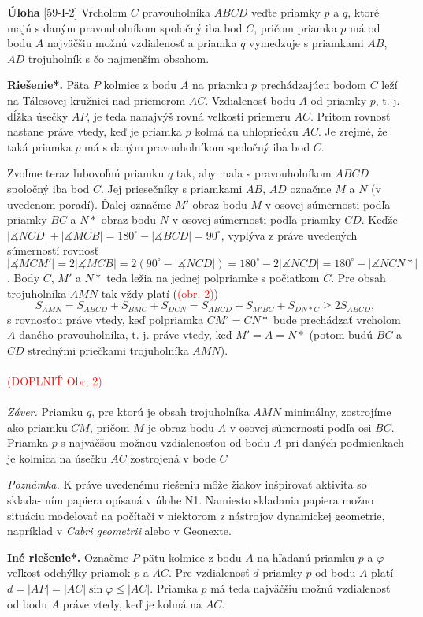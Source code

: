 \documentclass{article}
\newcommand{\rieh}{\textbf{Riešenie*.} }
\newcommand{\ma}{\measuredangle}
\newcommand\todo[1]{\noindent\textcolor{red}{(#1)}}
\newcommand{\problem}[3]{
  \begin{tcolorbox}[breakable,notitle,boxrule=0pt,colback=light-gray,colframe=light-gray]
    \textbf{Úloha}
    [#1] #2
  \end{tcolorbox}
  \noindent#3
}
\begin{document}
\problem{59-I-2}{
Vrcholom $C$ pravouholníka $ABCD$ veďte priamky $p$ a $q$, ktoré majú s daným pravouholníkom spoločný iba bod $C$, pričom priamka $p$ má od bodu $A$ najväčšiu možnú
vzdialenosť a priamka $q$ vymedzuje s priamkami $AB$, $AD$ trojuholník s čo najmenším obsahom. 
}{
\rieh Päta $P$ kolmice z bodu $A$ na priamku $p$ prechádzajúcu bodom $C$ leží na
Tálesovej kružnici nad priemerom $AC$. Vzdialenosť bodu $A$ od priamky $p$, t. j. dĺžka úsečky $AP$, je teda nanajvýš rovná veľkosti priemeru $AC$. Pritom rovnosť nastane práve vtedy, keď je priamka $p$ kolmá na uhlopriečku $AC$. Je zrejmé, že taká priamka $p$ má s daným pravouholníkom spoločný iba bod $C$.

Zvoľme teraz ľubovoľnú priamku $q$ tak, aby mala s pravouholníkom $ABCD$ spoločný iba bod $C$. Jej priesečníky s priamkami $AB$, $AD$ označme $M$ a $N$ (v uvedenom poradí). Ďalej označme $M'$ obraz bodu $M$ v osovej súmernosti podľa priamky $BC$ a $N*$ obraz bodu $N$ v osovej súmernosti podľa priamky $CD$. Keďže $|\ma NCD| + |\ma MCB|= 180^\circ- |\ma BCD| = 90^\circ$, vyplýva z práve uvedených súmerností rovnosť $|\ma MCM'| = 2|\ma MCB| = 2(90^\circ - |\ma NCD|) = 180^\circ - 2|\ma NCD| = 180^\circ - |\ma NCN* |$. Body $C$, $M'$ a $N*$ teda ležia na jednej polpriamke s počiatkom $C$. Pre obsah trojuholníka $AMN$
tak vždy platí (\todo{obr. 2})
$$S_{AMN}= S_{ABCD} + S_{BMC} + S_{DCN} = S_{ABCD} + S_{M'BC} + S_{DN*C} \geq 2S_{ABCD},$$
s rovnosťou práve vtedy, keď polpriamka $CM'= CN*$ bude prechádzať vrcholom $A$ daného pravouholníka, t. j. práve vtedy, keď $M'= A = N*$ (potom budú $BC$ a $CD$ strednými priečkami trojuholníka $AMN$).\\
\\
\todo{DOPLNIŤ Obr. 2}\\
\\
\textit{Záver.} Priamku $q$, pre ktorú je obsah trojuholníka $AMN$ minimálny, zostrojíme
ako priamku $CM$, pričom $M$ je obraz bodu $A$ v osovej súmernosti podľa osi $BC$.
Priamka $p$ s najväčšou možnou vzdialenosťou od bodu $A$ pri daných podmienkach
je kolmica na úsečku $AC$ zostrojená v bode $C$

\textit{Poznámka.} K práve uvedenému riešeniu môže žiakov inšpirovať aktivita so sklada-
ním papiera opísaná v úlohe N1. Namiesto skladania papiera možno situáciu modelovať
na počítači v niektorom z nástrojov dynamickej geometrie, napríklad v \textit{Cabri geometrii} alebo v {Geonexte}.

\textbf{Iné riešenie*.} Označme $P$ pätu kolmice z bodu $A$ na hľadanú priamku $p$ a $\varphi$ veľkosť odchýlky priamok $p$ a $AC$. Pre vzdialenosť $d$ priamky $p$ od bodu $A$ platí $d = |AP| = |AC| \sin \varphi \leq |AC|$. Priamka $p$ má teda najväčšiu možnú vzdialenosť od bodu $A$ práve vtedy, keď je kolmá na $AC$.

}
\end{document}
